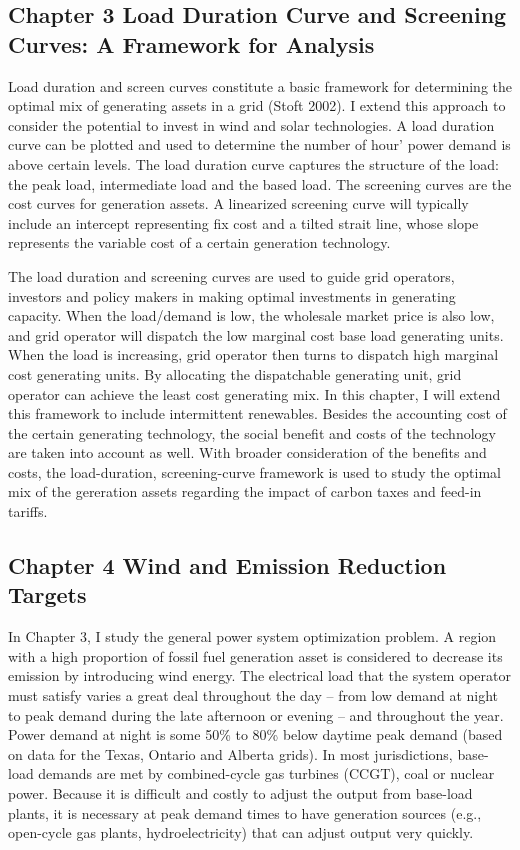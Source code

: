 \documentclass[10pt,letter]{article}
\begin{document}
\subsection{Chapter 3 Load Duration Curve and Screening Curves: A
Framework for
Analysis}\label{chapter-3-load-duration-curve-and-screening-curves-a-framework-for-analysis}

Load duration and screen curves constitute a basic framework for
determining the optimal mix of generating assets in a grid (Stoft 2002).
I extend this approach to consider the potential to invest in wind and
solar technologies. A load duration curve can be plotted and used to
determine the number of hour' power demand is above certain levels. The
load duration curve captures the structure of the load: the peak load,
intermediate load and the based load. The screening curves are the cost
curves for generation assets. A linearized screening curve will
typically include an intercept representing fix cost and a tilted strait
line, whose slope represents the variable cost of a certain generation
technology.

The \protect\hypertarget{OLE_LINK5}{}{}load duration and screening
curves are used to guide grid operators, investors and policy makers in
making optimal investments in generating capacity. When the load/demand
is low, the wholesale market price is also low, and grid operator will
dispatch the low marginal cost base load generating units. When the load
is increasing, grid operator then turns to dispatch high marginal cost
generating units. By allocating the dispatchable generating unit, grid
operator can achieve the least cost generating mix. In this chapter, I
will extend this framework to include intermittent renewables. Besides
the accounting cost of the certain generating technology, the social
benefit and costs of the technology are taken into account as well. With
broader consideration of the benefits and costs, the load-duration,
screening-curve framework is used to study the optimal mix of the
gereration assets regarding the impact of carbon taxes and feed-in
tariffs.

\subsection{Chapter 4 Wind and Emission Reduction
Targets}\label{chapter-4-wind-and-emission-reduction-targets}

In Chapter 3, I study the general power system optimization problem. A
region with a high proportion of fossil fuel generation asset is
considered to decrease its emission by introducing wind energy. The
electrical load that the system operator must satisfy varies a great
deal throughout the day -- from low demand at night to peak demand
during the late afternoon or evening -- and throughout the year. Power
demand at night is some 50\% to 80\% below daytime peak demand (based on
data for the Texas, Ontario and Alberta grids). In most jurisdictions,
base-load demands are met by combined-cycle gas turbines (CCGT), coal or
nuclear power. Because it is difficult and costly to adjust the output
from base-load plants, it is necessary at peak demand times to have
generation sources (e.g., open-cycle gas plants, hydroelectricity) that
can adjust output very quickly.
\end{document}
